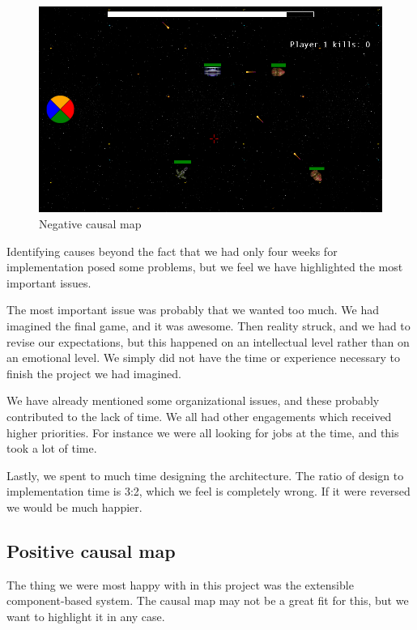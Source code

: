 \documentclass[titlepage,a4paper,11pt]{article}
\begin{document}
\begin{figure}
    \begin{center}
    \includegraphics[width=\linewidth]{graphics/ingame}
    \caption{Negative causal map}
    \label{fig:negmap}
    \end{center}
\end{figure}

Identifying causes beyond the fact that we had only four weeks for 
implementation posed some problems, but we feel we have highlighted the
most important issues.

The most important issue was probably that we wanted too much. We had 
imagined the final game, and it was awesome. Then reality struck, and we
had to revise our expectations, but this happened on an intellectual level
rather than on an emotional level. We simply did not have the time or 
experience necessary to finish the project we had imagined.

We have already mentioned some organizational issues, and these probably
contributed to the lack of time. We all had other engagements which
received higher priorities. For instance we were all looking for jobs at
the time, and this took a lot of time.

Lastly, we spent to much time designing the architecture. The ratio of
design to implementation time is 3:2, which we feel is completely wrong.
If it were reversed we would be much happier.

\subsection{Positive causal map}

The thing we were most happy with in this project was the extensible
component-based system.  The causal map may not be a great fit for this,
but we want to highlight it in any case.
\end{document}
